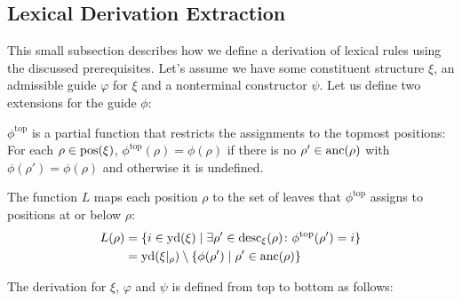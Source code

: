\documentclass[../../document.tex]{subfiles}
\begin{document}
    \subsection{Lexical Derivation Extraction}\label{sec:extractionalg}
    This small subsection describes how we define a derivation of lexical  rules using the discussed prerequisites.
    Let's assume we have some constituent structure \(\xi\), an admissible guide \(\varphi\) for \(\xi\) and a nonterminal constructor \(\psi\).
    Let us define two extensions for the guide \(\phi\):
    \begin{compactitem}
        \item
            \(\phi^{\text{top}}\) is a partial function that restricts the assignments to the topmost positions:
            For each \(\rho \in \operatorname{pos}(\xi)\), \(\phi^{\text{top}}(\rho) = \phi(\rho)\) if there is no \(\rho' \in \operatorname{anc}(\rho)\) with \(\phi(\rho') = \phi(\rho)\) and otherwise it is undefined.
        \item
            The function \(L\) maps each position \(\rho\) to the set of leaves that \(\phi^{\text{top}}\) assigns to positions at or below \(\rho\):
                \vspace{-\baselineskip}
                \begin{align*}
                    L(\rho) &= \{ i \in \operatorname{yd}(\xi) \mid \exists \rho' \in \operatorname{desc}_\xi(\rho)\colon \phi^{\text{top}}(\rho') = i \} \\
                            &= \operatorname{yd}(\xi|_\rho) \setminus \{ \phi(\rho') \mid \rho' \in \operatorname{anc}(\rho) \}
                \end{align*}
    \end{compactitem}
    The derivation for \(\xi\), \(\varphi\) and \(\psi\) is defined from top to bottom as follows:
\end{document}

